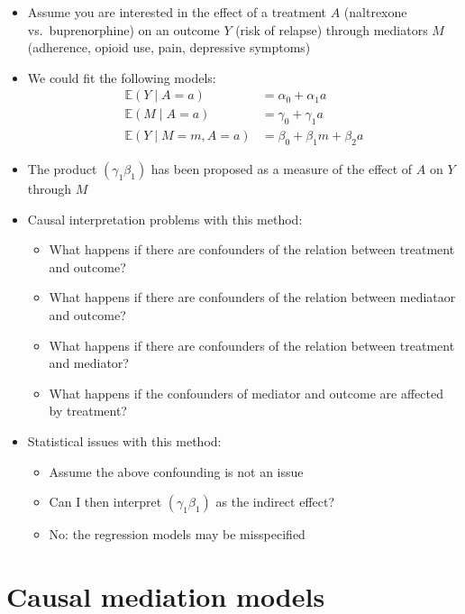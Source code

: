 \documentclass[
  12pt,
]{book}
\providecommand{\tightlist}{%
  \setlength{\itemsep}{0pt}\setlength{\parskip}{0pt}}
\theoremstyle{definition}
\theoremstyle{definition}
\theoremstyle{definition}
\newcommand{\E}{\mathbb{E}}
\newcommand{\1}{\mathbbm{1}}
\begin{document}
\begin{itemize}
\tightlist
\item
  Assume you are interested in the effect of a treatment \(A\) (naltrexone vs.~buprenorphine) on an outcome \(Y\) (risk of relapse) through mediators \(M\)
  (adherence, opioid use, pain, depressive symptoms)
\item
  We could fit the following models:
  \begin{align}
      \E(Y\mid A=a) & = \alpha_0 + \alpha_1 a\\
      \E(M\mid A=a) & = \gamma_0 + \gamma_1 a\\
      \E(Y\mid M=m, A=a) & = \beta_0 + \beta_1 m + \beta_2 a
    \end{align}
\item
  The product \((\gamma_1\beta_1)\) has been proposed as a measure of the effect
  of \(A\) on \(Y\) through \(M\)
\item
  Causal interpretation problems with this method:

  \begin{itemize}
  \tightlist
  \item
    What happens if there are confounders of the relation between treatment and outcome?
  \item
    What happens if there are confounders of the relation between mediataor and outcome?
  \item
    What happens if there are confounders of the relation between treatment and mediator?
  \item
    What happens if the confounders of mediator and outcome are affected by treatment?
  \end{itemize}
\item
  Statistical issues with this method:

  \begin{itemize}
  \tightlist
  \item
    Assume the above confounding is not an issue
  \item
    Can I then interpret \((\gamma_1\beta_1)\) as the indirect effect?
  \item
    No: the regression models may be misspecified
  \end{itemize}
\end{itemize}

\hypertarget{causal-mediation-models}{%
\section{Causal mediation models}\label{causal-mediation-models}}
\end{document}
